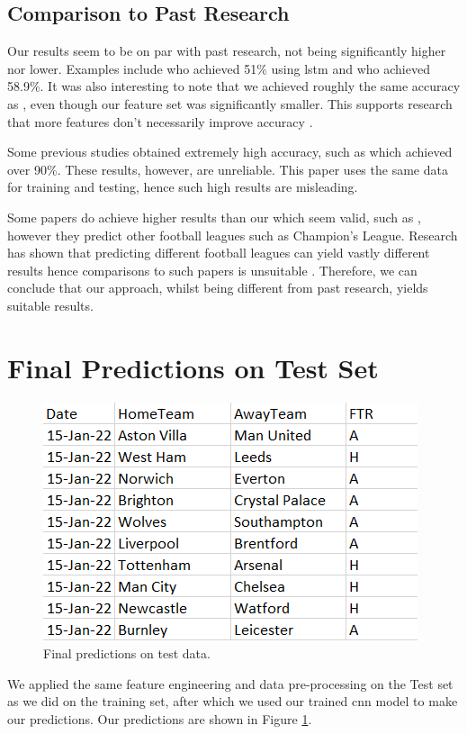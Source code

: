 \documentclass{article}
\begin{document}
\subsection{Comparison to Past Research}
\label{pastresearch}

Our results seem to be on par with past research, not being significantly higher nor lower. Examples include \cite{goddijn2018surebet} who achieved 51\% using \gls{lstm} and \cite{mccabe2008artificial} who achieved 58.9\%. It was also interesting to note that we achieved roughly the same accuracy as \cite{dubitzky2019open}, even though our feature set was significantly smaller. This supports research that more features don’t necessarily improve accuracy \cite{horvat2020use}.  

Some previous studies obtained extremely high accuracy, such as \cite{owramipur2013football} which achieved over 90\%. These results, however, are unreliable. This paper uses the same data for training and testing, hence such high results are misleading.

Some papers do achieve higher results than our which seem valid, such as \cite{hucaljuk2011predicting}, however they predict other football leagues such as Champion’s League. Research has shown that predicting different football leagues can yield vastly different results hence comparisons to such papers is unsuitable \cite{horvat2020use}. Therefore, we can conclude that our approach, whilst being different from past research, yields suitable results. 

\section{Final Predictions on Test Set}
\label{finalpred}

\begin{figure}[!htb]
    \centering
    \includegraphics[width=0.5\linewidth]{Images/Figure 8.png}
    \caption{Final predictions on test data.}
    \label{fig:predictions}
\end{figure}

We applied the same feature engineering and data pre-processing on the Test set as we did on the training set, after which we used our trained \gls{cnn} model to make our predictions. Our predictions are shown in Figure \ref{fig:predictions}.
\end{document}

